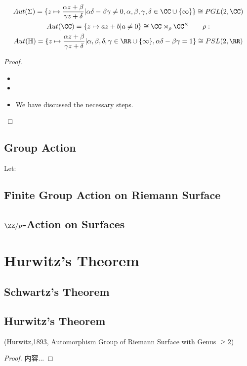 \documentclass[Total.tex]{subfiles}
\begin{document}
			\begin{proposition}
				\begin{gather*}
					Aut(\Sigma)=\{z\mapsto \frac{\alpha z+\beta}{\gamma z+\delta}|\alpha\delta-\beta\gamma\not=0,\alpha,\beta,\gamma,\delta\in \CC\cup \{\infty\}\}\cong PGL(2,\CC)\\
					Aut(\CC)=\{z\mapsto az+b|a\not=0\}\cong \CC\rtimes_\rho \CC^\times\qquad \rho:\\
					Aut(\mathbb{H})=\{z\mapsto \frac{\alpha z+\beta}{\gamma z+\delta}|\alpha,\beta,\delta,\gamma\in \RR\cup \{\infty\},\alpha\delta-\beta\gamma=1\}\cong PSL(2,\RR)
				\end{gather*}
			\end{proposition}
			\begin{proof}
				\begin{itemize}
					\item 
					\item 
					\item We have discussed the necessary steps. 
				\end{itemize}
			\end{proof}
			\subsection{Group Action}
			\begin{theorem}
				Let: 
			\end{theorem}
			
			\subsection{Finite Group Action on Riemann Surface}
			
			\subsection{$\ZZ/p$-Action on Surfaces}
		\section{Hurwitz's Theorem}
			\subsection{Schwartz's Theorem}
			
			\subsection{Hurwitz's Theorem}
				\begin{theorem}
					(Hurwitz,1893, Automorphism Group of Riemann Surface with Genus $\geq 2$)
				\end{theorem}
				\begin{proof}
					内容...
				\end{proof}
				
\end{document}
